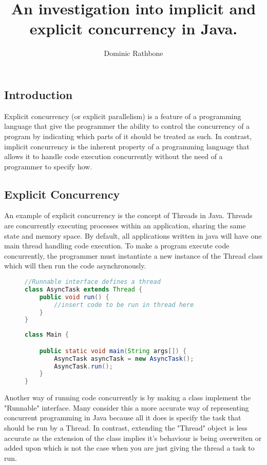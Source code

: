 \documentclass[]{report}
\title{An investigation into implicit and explicit concurrency in Java.}
\author{Dominic Rathbone}
\begin{document}
\maketitle

\subsection{Introduction}
Explicit concurrency (or explicit parallelism) is a feature of a programming language that give the programmer the ability to control the concurrency of a program by indicating which parts of it should be treated as such. In contrast, implicit concurrency is the inherent property of a programming language that allows it to handle code execution concurrently without the need of a programmer to specify how.

\subsection{Explicit Concurrency}
An example of explicit concurrency is the concept of Threads in Java. Threads are concurrently executing processes within an application, sharing the same state and memory space. By default, all applications written in java will have one main thread handling code execution. To make a program execute code concurrently, the programmer must instantiate a new instance of the Thread class which will then run the code asynchronously.

\begin{figure}
\caption{}
\begin{lstlisting}[language=Java,frame=single]
//Runnable interface defines a thread
class AsyncTask extends Thread {
	public void run() {
		//insert code to be run in thread here
	}
}
\end{lstlisting}
\end{figure}

\begin{figure}
\caption{}
\begin{lstlisting}[language=Java,frame=single]
class Main {

	public static void main(String args[]) { 
		AsyncTask asyncTask = new AsyncTask();
		AsyncTask.run();
	}
}
\end{lstlisting}
\end{figure}

Another way of running code concurrently is by making a class implement the "Runnable" interface. Many consider this a more accurate way of representing concurrent programming in Java because all it does is specify the task that should be run by a Thread. In contrast, extending the "Thread" object is less accurate as the extension of the class implies it's behaviour is being overwriten or added upon which is not the case when you are just giving the thread a task to run.
\end{document}
